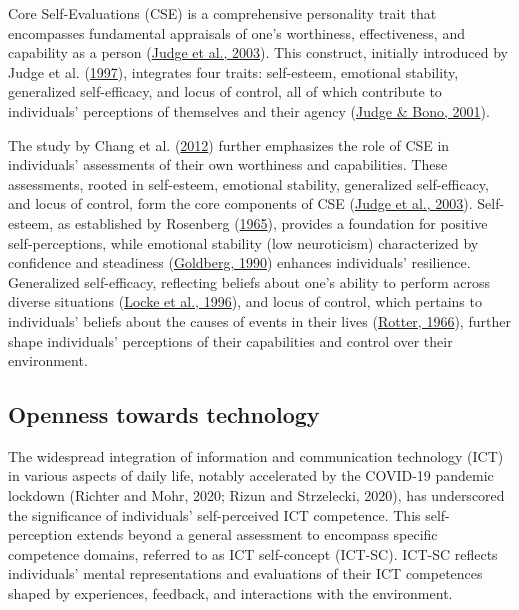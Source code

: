 \documentclass[
  12pt,
  a4paper,
  twoside]{article}
\begin{document}
Core Self-Evaluations (CSE) is a comprehensive personality trait that encompasses fundamental appraisals of one's worthiness, effectiveness, and capability as a person (\protect\hyperlink{ref-judge2003}{Judge et al., 2003}). This construct, initially introduced by Judge et al. (\protect\hyperlink{ref-judge1997}{1997}), integrates four traits: self-esteem, emotional stability, generalized self-efficacy, and locus of control, all of which contribute to individuals' perceptions of themselves and their agency (\protect\hyperlink{ref-judge2001}{Judge \& Bono, 2001}).

The study by Chang et al. (\protect\hyperlink{ref-chang2012}{2012}) further emphasizes the role of CSE in individuals' assessments of their own worthiness and capabilities. These assessments, rooted in self-esteem, emotional stability, generalized self-efficacy, and locus of control, form the core components of CSE (\protect\hyperlink{ref-judge2003}{Judge et al., 2003}). Self-esteem, as established by Rosenberg (\protect\hyperlink{ref-rosenberg1965}{1965}), provides a foundation for positive self-perceptions, while emotional stability (low neuroticism) characterized by confidence and steadiness (\protect\hyperlink{ref-goldberg1990}{Goldberg, 1990}) enhances individuals' resilience. Generalized self-efficacy, reflecting beliefs about one's ability to perform across diverse situations (\protect\hyperlink{ref-locke1996}{Locke et al., 1996}), and locus of control, which pertains to individuals' beliefs about the causes of events in their lives (\protect\hyperlink{ref-rotter1966}{Rotter, 1966}), further shape individuals' perceptions of their capabilities and control over their environment.

\hypertarget{openness-towards-technology}{%
\subsection{Openness towards technology}\label{openness-towards-technology}}

The widespread integration of information and communication technology (ICT) in various aspects of daily life, notably accelerated by the COVID-19 pandemic lockdown (Richter and Mohr, 2020; Rizun and Strzelecki, 2020), has underscored the significance of individuals' self-perceived ICT competence. This self-perception extends beyond a general assessment to encompass specific competence domains, referred to as ICT self-concept (ICT-SC). ICT-SC reflects individuals' mental representations and evaluations of their ICT competences shaped by experiences, feedback, and interactions with the environment.
\end{document}
